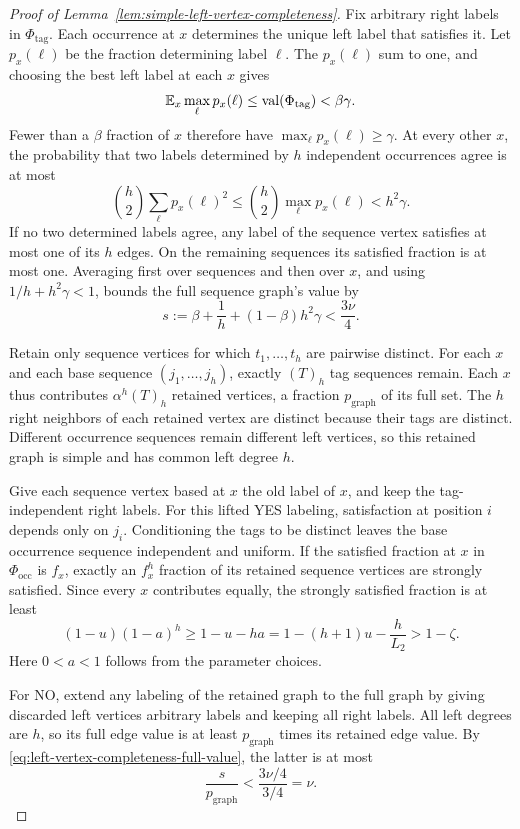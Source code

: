 \begin{proof}[Proof of Lemma~\ref{lem:simple-left-vertex-completeness}]
Fix arbitrary right labels in \(\Phi_{\mathrm{tag}}\).  Each occurrence
at \(x\) determines the unique left label that satisfies it.  Let \(p_x(\ell)\)
be the fraction determining label \(\ell\).  The \(p_x(\ell)\) sum to
one, and choosing the best left label at each \(x\) gives
\[
 \mathbb E_x\max_\ell p_x(\ell)\le\operatorname{val}(\Phi_{\mathrm{tag}})<\beta\gamma.
\]
Fewer than a \(\beta\) fraction of \(x\) therefore have
\(\max_\ell p_x(\ell)\ge\gamma\).  At every other \(x\), the probability
that two labels determined by \(h\) independent occurrences agree is
at most
\[
 \binom h2\sum_\ell p_x(\ell)^2
 \le \binom h2\max_\ell p_x(\ell)<h^2\gamma.
\]
If no two determined labels agree, any label of the sequence vertex
satisfies at most one of its \(h\) edges.  On the remaining sequences
its satisfied fraction is at most one.  Averaging first over sequences
and then over \(x\), and using \(1/h+h^2\gamma<1\), bounds the full
sequence graph's value by
\begin{equation}
 s:=\beta+\frac1h+(1-\beta)h^2\gamma<\frac{3\nu}{4}.
\label{eq:left-vertex-completeness-full-value}
\end{equation}

Retain only sequence vertices for which \(t_1,\ldots,t_h\) are
pairwise distinct.  For each \(x\) and each base sequence
\((j_1,\ldots,j_h)\), exactly \((T)_h\) tag sequences remain.
Each \(x\) thus contributes \(\alpha^h(T)_h\) retained vertices, a
fraction \(p_{\mathrm{graph}}\) of its full set.  The \(h\) right
neighbors of each retained vertex are distinct because their tags are
distinct.  Different occurrence sequences remain different left
vertices, so this retained graph is simple and has common left degree
\(h\).

Give each sequence vertex based at \(x\) the old label of \(x\), and
keep the tag-independent right labels.  For this lifted YES labeling,
satisfaction at position \(i\) depends only on \(j_i\).  Conditioning
the tags to be distinct leaves the base occurrence sequence independent
and uniform.  If the satisfied fraction at \(x\) in
\(\Phi_{\mathrm{occ}}\) is \(f_x\), exactly an \(f_x^h\) fraction of
its retained sequence vertices are strongly satisfied.
Since every \(x\) contributes equally, the strongly satisfied fraction
is at least
\[
 (1-u)(1-a)^h
 \ge 1-u-ha
 =1-(h+1)u-\frac h{L_2}>1-\zeta.
\]
Here \(0<a<1\) follows from the parameter choices.

For NO, extend any labeling of the retained graph to the full graph by
giving discarded left vertices arbitrary labels and keeping all right
labels.  All left degrees are \(h\), so its full edge value is at least
\(p_{\mathrm{graph}}\) times its retained edge value.  By
\eqref{eq:left-vertex-completeness-full-value}, the latter is at most
\[
 \frac{s}{p_{\mathrm{graph}}}<\frac{3\nu/4}{3/4}=\nu.
\]


\end{proof}
